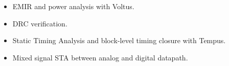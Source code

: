 \begin{cventries}
{\begin{cvitems}
\begin{itemize}
\begin{itemize}
\begin{itemize}
              \item {EMIR and power analysis with Voltus.}
              \item {DRC verification.}
              \item {Static Timing Analysis and block-level timing closure with Tempus.}
              \item {Mixed signal STA between analog and digital datapath.}
            \end{itemize}
          \end{itemize}
        \end{itemize}
      \end{cvitems}
    }




\end{cventries}
